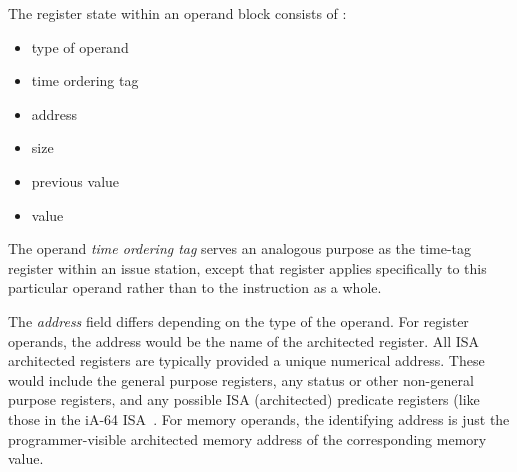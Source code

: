 \documentclass[10pt,dvips]{article}
\begin{document}
The register state within an operand block consists of :
%
\begin{itemize}
\vspace{-0.10in}
\item{type of operand}
\vspace{-0.10in}
\item{time ordering tag}
\vspace{-0.10in}
\item{address}
\vspace{-0.10in}
\item{size}
\vspace{-0.10in}
\item{previous value}
\vspace{-0.10in}
\item{value}
\vspace{-0.10in}
\end{itemize}   
%
The operand \textit{time ordering tag}
serves
an analogous purpose as the time-tag register within an issue station,
except that register applies specifically to this particular
operand rather than to the instruction as a whole.

The \textit{address} field differs
depending on the type of the operand.
For register operands, the address would be
the name of the architected register.
All ISA architected registers are typically provided a
unique numerical address.  These would include the
general purpose registers, any status or other non-general
purpose registers, and any possible ISA (architected) predicate registers
(like those in the iA-64 ISA~\cite{intel99ia,schlansker00epic}.
For memory operands, the identifying address is just the
programmer-visible architected memory address of the corresponding
memory value.
\end{document}
